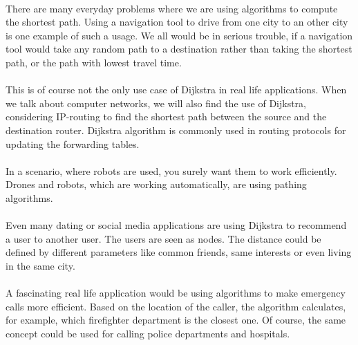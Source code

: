 \documentclass[a4paper,12pt]{article}
\begin{document}
\\There are many everyday problems where we are using algorithms to compute the shortest path. Using a navigation tool to drive from one city to an other city is one example of such a usage. We all would be in serious trouble, if a navigation tool would take any random path to a destination rather than taking the shortest path, or the path with lowest travel time.\\
\\This is of course not the only use case of Dijkstra in real life applications. When we talk about computer networks, we will also find the use of Dijkstra, considering IP-routing to find the shortest path between the source and the destination router. Dijkstra algorithm is commonly used in routing protocols for updating the forwarding tables.\\
\\In a scenario, where robots are used, you surely want them to work efficiently. Drones and robots, which are working automatically, are using pathing algorithms.\\
\\Even many dating or social media applications are using Dijkstra to recommend a user to another user. The users are seen as nodes. The distance could be defined by different parameters like common friends, same interests or even living in the same city.\cite{geeksdijkstra}\\
\\A fascinating real life application would be using algorithms to make emergency calls more efficient. Based on the location of the caller, the algorithm calculates, for example, which firefighter department is the closest one. Of course, the same concept could be used for calling police departments and hospitals.
\end{document}
